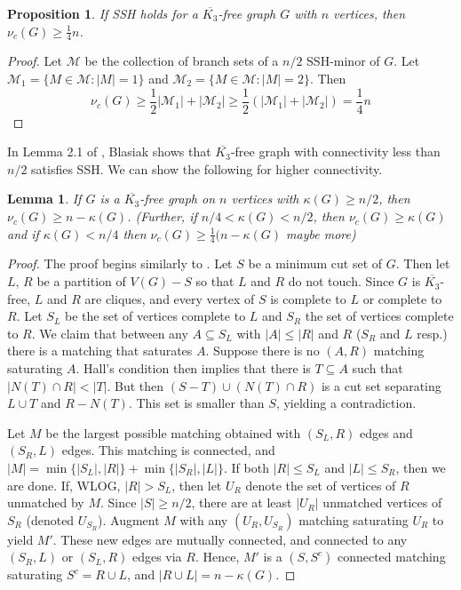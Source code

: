 \documentclass[12pt]{article}
\newtheorem{prop}{Proposition}
\newtheorem{lem}{Lemma}
\theoremstyle{definition}
\newcommand{\kfree}{$\overline{K_3}$-free\xspace}
\begin{document}
\begin{prop}
	If SSH holds for a \kfree graph $G$ with $n$ vertices, then $\nu_c(G) \geq \frac{1}{4}n$. 
\end{prop}
\begin{proof}
	Let $\mathcal{M}$ be the collection of branch sets of a $n/2$ SSH-minor of $G$.  Let $\mathcal{M}_1 = \{M\in \mathcal{M}: |M| = 1\}$ and $\mathcal{M}_2 = \{M\in \mathcal{M}: |M| = 2\}$. Then 
\[\nu_c(G) \geq \frac{1}{2}|\mathcal{M}_1| + |\mathcal{M}_2| \geq \frac{1}{2}(|\mathcal{M}_1| + |\mathcal{M}_2|) = \frac{1}{4}n\]
\end{proof}
In Lemma 2.1 of \cite{blas}, Blasiak shows that \kfree graph with connectivity less than $n/2$ satisfies SSH.  We can show the following for higher connectivity.
\begin{lem}
	If $G$ is a \kfree graph on $n$ vertices with $\kappa(G) \geq n/2$, then $\nu_c(G) \geq n-\kappa(G)$.  (Further, if $n/4 < \kappa(G) < n/2$, then $\nu_c(G) \geq \kappa(G)$ and if $\kappa(G) < n/4$ then $\nu_c(G) \geq \frac{1}{4}(n-\kappa(G)$ maybe more) 
\end{lem}
\begin{proof}
	The proof begins similarly to \cite{blas}. Let $S$ be a minimum cut set of $G$.  Then let $L$, $R$ be a partition of $V(G) - S$ so that $L$ and $R$ do not touch.  Since $G$ is \kfree, $L$ and $R$ are cliques, and every vertex of $S$ is complete to $L$ or complete to $R$.  Let $S_L$ be the set of vertices complete to $L$ and $S_R$ the set of vertices complete to $R$.    We claim that between any $A \subseteq S_L$ with $|A| \leq |R|$ and $R$ ($S_R$ and $L$ resp.) there is a matching that saturates $A$.  Suppose there is no $(A, R)$ matching saturating $A$.  Hall's condition then implies that there is $T\subseteq A$ such that $|N(T)\cap R| < |T|$. But then $(S-T)\cup (N(T)\cap R)$ is a cut set separating $L\cup T$ and $R-N(T)$. This set is smaller than $S$, yielding a contradiction.   

Let $M$ be the largest possible matching obtained with $(S_L,R)$ edges and $(S_R,L)$ edges.  This matching is connected, and $|M| = \min\{|S_L|, |R|\} + \min\{|S_R|, |L|\}$.  If both $|R| \leq S_L$ and $|L| \leq S_R$, then we are done.  If, WLOG,  $|R| > S_L$, then let $U_R$ denote the set of vertices of $R$ unmatched by $M$.  Since $|S|\geq n/2$, there are at least $|U_R|$ unmatched vertices of $S_R$ (denoted $U_{S_R}$).  Augment $M$ with any $(U_R , U_{S_R})$ matching saturating $U_R$ to yield $M'$.  These new edges are mutually connected, and connected to any $(S_R,L)$ or $(S_L, R)$ edges via $R$.  Hence, $M'$ is a $(S,S^c)$ connected matching saturating $S^c = R\cup L$, and $|R\cup L| = n-\kappa(G)$. 
\end{proof}
\end{document}
